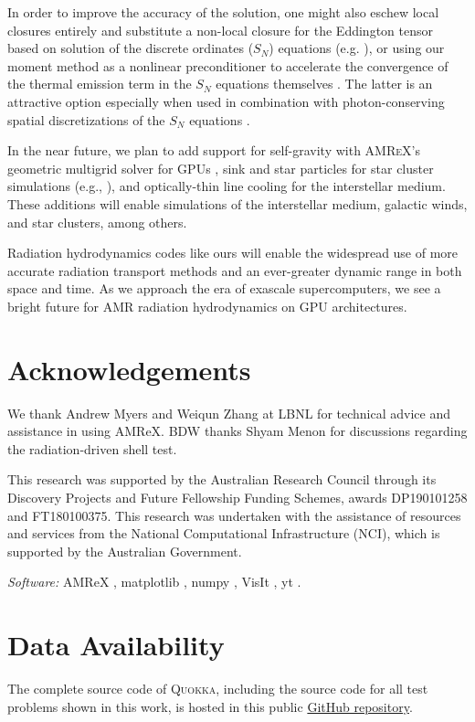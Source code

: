 \documentclass[fleqn,usenatbib]{mnras}
\begin{document}
In order to improve the accuracy of the solution, one might also eschew local closures entirely and substitute a non-local closure for the Eddington tensor based on solution of the discrete ordinates ($S_N$) equations (e.g. \citealt{Davis_2012,Jiang12a}), or using our moment method as a nonlinear preconditioner to accelerate the convergence of the thermal emission term in the $S_N$ equations themselves \citep{Park_2012}. The latter is an attractive option especially when used in combination with photon-conserving spatial discretizations of the $S_N$ equations \citep{Adams97a,Adams_2001}.

In the near future, we plan to add support for self-gravity with \textsc{AMReX}'s geometric multigrid solver for GPUs \citep{AMReX_JOSS}, sink and star particles for star cluster simulations (e.g., \citealt{Krumholz04a, Offner09a}), and optically-thin line cooling for the interstellar medium. These additions will enable simulations of the interstellar medium, galactic winds, and star clusters, among others.

Radiation hydrodynamics codes like ours will enable the widespread use of more accurate radiation transport methods and an ever-greater dynamic range in both space and time. As we approach the era of exascale supercomputers, we see a bright future for AMR radiation hydrodynamics on GPU architectures.

\section*{Acknowledgements}
We thank Andrew Myers and Weiqun Zhang at LBNL for technical advice and assistance in using AMReX. BDW thanks Shyam Menon for discussions regarding the radiation-driven shell test.

This research was supported by the Australian Research Council through its Discovery Projects and Future Fellowship Funding Schemes, awards DP190101258 and FT180100375. This research was undertaken with the assistance of resources and services from the National Computational Infrastructure (NCI), which is supported by the Australian Government.

\emph{Software:} AMReX \citep{the_amrex_development_team_2021_5363443},
matplotlib \citep{Hunter:2007},
numpy \citep{harris2020array},
VisIt \citep{HPV:VisIt},
yt \citep{Turk11a}.

\section*{Data Availability}
The complete source code of \textsc{Quokka}, including the source code for all test problems shown in this work, is hosted in this public \faGithub\href{https://github.com/BenWibking/quokka-code}{GitHub repository}.
\end{document}
